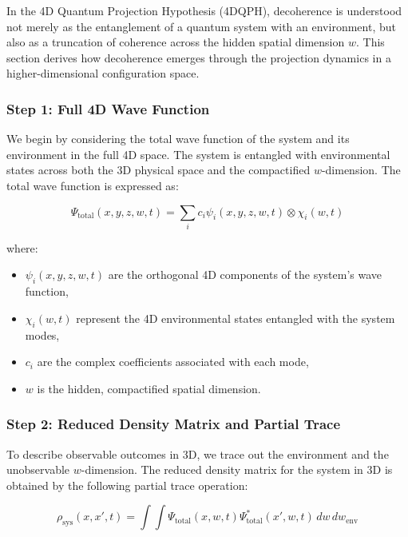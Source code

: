 \documentclass[12pt]{article}
\begin{document}
In the 4D Quantum Projection Hypothesis (4DQPH), decoherence is understood not merely as the entanglement of a quantum system with an environment, but also as a truncation of coherence across the hidden spatial dimension \( w \). This section derives how decoherence emerges through the projection dynamics in a higher-dimensional configuration space.

\subsubsection*{Step 1: Full 4D Wave Function}

We begin by considering the total wave function of the system and its environment in the full 4D space. The system is entangled with environmental states across both the 3D physical space and the compactified \( w \)-dimension. The total wave function is expressed as:

\begin{equation}
\Psi_{\text{total}}(x, y, z, w, t) = \sum_i c_i \psi_i(x, y, z, w, t) \otimes \chi_i(w, t)
\label{eq:total_wave_function}
\end{equation}

where:
\begin{itemize}
    \item \( \psi_i(x, y, z, w, t) \) are the orthogonal 4D components of the system's wave function,
    \item \( \chi_i(w, t) \) represent the 4D environmental states entangled with the system modes,
    \item \( c_i \) are the complex coefficients associated with each mode,
    \item \( w \) is the hidden, compactified spatial dimension.
\end{itemize}

\subsubsection*{Step 2: Reduced Density Matrix and Partial Trace}

To describe observable outcomes in 3D, we trace out the environment and the unobservable \( w \)-dimension. The reduced density matrix for the system in 3D is obtained by the following partial trace operation:

\begin{equation}
\rho_{\text{sys}}(x, x', t) = \int \int \Psi_{\text{total}}(x, w, t) \Psi_{\text{total}}^*(x', w, t) \, d w \, d w_{\text{env}}
\label{eq:reduced_density_matrix}
\end{equation}
\end{document}
